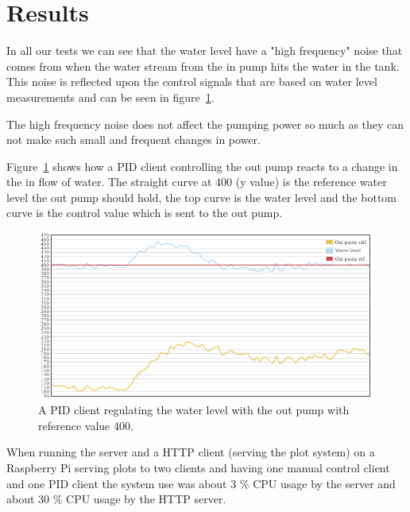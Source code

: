 \documentclass{article}
\begin{document}
\section{Results}\label{results}
In all our tests we can see that the water level have a "high frequency" noise
that comes from when the water stream from the in pump hits the water in the
tank. This noise is reflected upon the control signals that are based on water
level measurements and can be seen in figure~\ref{fig:out pump}. 

The high frequency noise does not affect the pumping power so much as they can not make such small and frequent changes in power.

Figure~\ref{fig:out pump} shows how a PID client controlling the out pump reacts
to a change in the in flow of water. The straight curve at 400 (y value) is the
reference water level the out pump should hold, the top curve is the water level
and the bottom curve is the control value which is sent to the out pump.

\begin{figure}[H]
\includegraphics[width=1.0\textwidth]{plot1.png}
\caption{A PID client regulating the water level with the out pump with reference value 400.}
\label{fig:out pump}
\end{figure}

When running the server and a HTTP client (serving the plot system) on a
Raspberry Pi serving plots to two clients and having one manual control client
and one PID client the system use was about 3 \% CPU usage by the server and 
about 30 \% CPU usage by the HTTP server.
\end{document}
